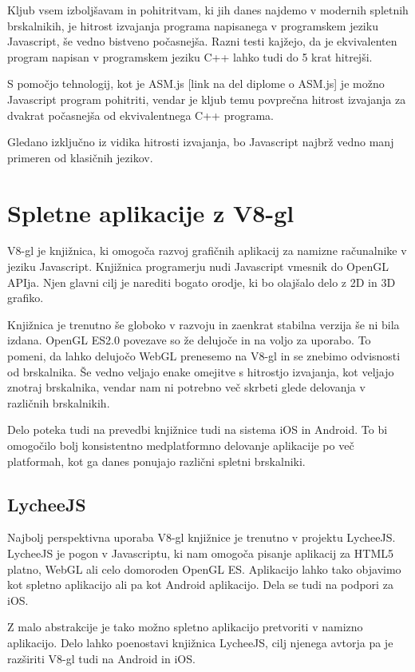 Kljub vsem izboljšavam in pohitritvam, ki jih danes najdemo v modernih spletnih brskalnikih, je hitrost izvajanja programa napisanega v programskem jeziku Javascript, še vedno bistveno počasnejša. Razni testi kajžejo, da je ekvivalenten program napisan v programskem jeziku C++ lahko tudi do 5 krat hitrejši.

S pomočjo tehnologij, kot je ASM.js [link na del diplome o ASM.js] je možno Javascript program pohitriti, vendar je kljub temu povprečna hitrost izvajanja za dvakrat počasnejša od ekvivalentnega C++ programa.

Gledano izključno iz vidika hitrosti izvajanja, bo Javascript najbrž vedno manj primeren od klasičnih jezikov.

\section{Spletne aplikacije z V8-gl}

V8-gl je knjižnica, ki omogoča razvoj grafičnih aplikacij za namizne računalnike v jeziku Javascript. Knjižnica programerju nudi Javascript vmesnik do OpenGL APIja. Njen glavni cilj je narediti bogato orodje, ki bo olajšalo delo z 2D in 3D grafiko.

Knjižnica je trenutno še globoko v razvoju in zaenkrat stabilna verzija še ni bila izdana. OpenGL ES2.0 povezave so že delujoče in na voljo za uporabo. To pomeni, da lahko delujočo WebGL prenesemo na V8-gl in se znebimo odvisnosti od brskalnika. Še vedno veljajo enake omejitve s hitrostjo izvajanja, kot veljajo znotraj brskalnika, vendar nam ni potrebno več skrbeti glede delovanja v različnih brskalnikih.

Delo poteka tudi na prevedbi knjižnice tudi na sistema iOS in Android. To bi omogočilo bolj konsistentno medplatformno delovanje aplikacije po več platformah, kot ga danes ponujajo različni spletni brskalniki.

\subsection{LycheeJS}

Najbolj perspektivna uporaba V8-gl knjižnice je trenutno v projektu LycheeJS. LycheeJS je pogon v Javascriptu, ki nam omogoča pisanje aplikacij za HTML5 platno, WebGL ali celo domoroden OpenGL ES. Aplikacijo lahko tako objavimo kot spletno aplikacijo ali pa kot Android aplikacijo. Dela se tudi na podpori za iOS.

Z malo abstrakcije je tako možno spletno aplikacijo pretvoriti v namizno aplikacijo. Delo lahko poenostavi knjižnica LycheeJS, cilj njenega avtorja pa je razširiti V8-gl tudi na Android in iOS.


